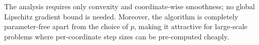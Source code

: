 \documentclass{article}
\begin{document}
The analysis requires only convexity and coordinate‑wise smoothness; no global Lipschitz gradient bound is needed.  Moreover, the algorithm is completely parameter‑free apart from the choice of $p$, making it attractive for large‑scale problems where per‑coordinate step sizes can be pre‑computed cheaply.
\end{document}
